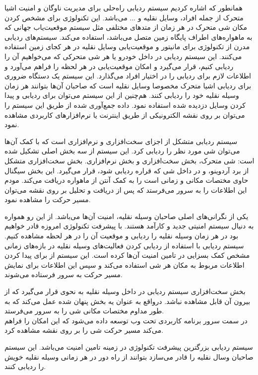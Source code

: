 همانطور که اشاره کردیم سیستم ردیابی راه‌حلی برای مدیریت ناوگان و امنیت اشیا متحرک از جمله افراد، وسایل نقلیه و ... می‌باشد. این تکنولوژی برای مشخص کردن مکان شی متحرک در هر زمان از متدهای مختلفی مثل سیستم موقعیت‌یاب جهانی  که به ماهواره‌های اطراف پایگاه زمین متصل می‌باشد، استفاده می‌کند. سیستم‌های ردیابی مدرن از تکنولوژی  برای مانیتور و موقعیت‌یابی وسایل نقلیه در هر کجای زمین استفاده می‌کنند. این سیستم ردیابی در داخل خودرو یا هر شی متحرکی که می‌خواهیم آن را ردیابی کنیم، قرار می‌گیرد و امکان موقعیت‌یابی در هر لحظه را فراهم می‌آورد  و اطلاعات لازم برای ردیابی را در اختیار افراد می‌گذارد. این سیستم یک دستگاه ضروری برای ردیابی اشیا متحرک مخصوصا وسایل نقلیه است که صاحبان آن‌ها بتوانند هر زمان وسیله نقلیه خود را ردیابی کنند. هم‌چنین از این سیستم می‌توان برای ردیابی و پیدا کردن وسایل دزدیده شده استفاده نمود. داده جمع‌آوری شده از طریق این سیستم را می‌توان بر روی نقشه الکترونیکی از طریق اینترنت یا نرم‌افزارهای کاربردی مشاهده نمود.


سیستم ردیابی متشکل از اجزای سخت‌افزاری و نرم‌افزاری است که با کمک آن‌ها می‌توان شی مورد نظر را ردیابی کرد. این سیستم از سه بخش اصلی تشکیل شده است: شی متحرک، بخش سخت‌افزاری و بخش نرم‌افزاری.
بخش سخت‌افزاری متشکل از برد آردوینو،  و  در داخل شی که قراره ردیابی شود، قرار می‌گیرد. این بخش سیگنال حاوی مختصات مکانی و زمانی است را به کمک آنتن  از ماهواره دریافت می‌کند. مودم  این اطلاعات را به سرور می‌فرستد که پس از دریافت و تحلیل بر روی نقشه می‌توان مسیر حرکت را مشاهده نمود.


 یکی از نگرانی‌های اصلی صاحبان وسیله نقلیه، امنیت آن‌ها می‌باشد. از این رو همواره به دنیال سیستم امنیتی جدید و کارآمد هستند. با پیشرفت تکنولوژی امروزه قادر خواهیم بود در هر زمان وسیله نقلیه را ردیابی و موقعیت آن را در هر لحظه مشاهده کنیم. سیستم ردیابی با استفاده از ردیابی  کردن فعالیت‌های وسیله نقلیه در بازه‌های زمانی مشخص کمک بسزایی در تامین امنیت آن‌ها کرده است. این سیستم از  برای پیدا کردن اطلاعات مربوط به مکان هر شی استفاده می‌کند و سپس  این اطلاعات برای نمایش مسیر حرکت به سرور فرستاده می‌شوند.
 
 
 بخش سخت‌افزاری سیستم ردیابی در داخل وسیله نقلیه به نحوی قرار می‌گیرد که از بیرون آن قابل مشاهده نباشد. درواقع به عنوان یه بخش پنهان شده عمل می‌کند که به طور مداوم مختصات مکانی شی را به سرور می‌فرستد.
 \\
 در سمت سرور برنامه کاربردی تحت وب توسعه داده می‌شود که این امکان را فراهم می‌کند  مسیر حرکت شی را بر روی نقشه مشاهده کرد.
 
 سیستم ردیابی بزرگترین پیشرفت تکنولوژی در زمینه تامین امنیت می‌باشد. این سیستم صاحبان وسال نقلیه را قادر می‌سازد بتوانند از راه دور در هر زمانی وسیله نقلیه خویش را ردیابی کنند.
 

